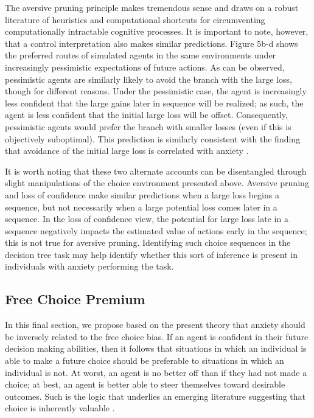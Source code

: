 \documentclass[11pt]{article} %
\begin{document}
The aversive pruning principle makes tremendous sense and draws on a robust literature of heuristics and computational shortcuts for circumventing computationally intractable cognitive processes. It is important to note, however, that a control interpretation also makes similar predictions. Figure 5b-d shows the preferred routes of simulated agents in the same environments under increasingly pessimistic expectations of future actions. As can be observed, pessimistic agents are similarly likely to avoid the branch with the large loss, though for different reasons. Under the pessimistic case, the agent is increasingly less confident that the large gains later in sequence will be realized; as such, the agent is less confident that the initial large loss will be offset. Consequently, pessimistic agents would prefer the branch with smaller losses (even if this is objectively suboptimal). This prediction is similarly consistent with the finding that avoidance of the initial large loss is correlated with anxiety \cite{Lally2017}.


It is worth noting that these two alternate accounts can be disentangled through slight manipulations of the choice environment presented above. Aversive pruning and loss of confidence make similar predictions when a large loss begins a sequence, but not necessarily when a large potential loss comes later in a sequence. In the loss of confidence view, the potential for large loss late in a sequence negatively impacts the estimated value of actions early in the sequence; this is not true for aversive pruning. Identifying such choice sequences in the decision tree task may help identify whether this sort of inference is present in individuals with anxiety performing the task.

\subsection{Free Choice Premium}

In this final section, we propose based on the present theory that anxiety should be inversely related to the free choice bias. If an agent is confident in their future decision making abilities, then it follows that situations in which an individual is able to make a future choice should be preferable to situations in which an individual is not. At worst, an agent is no better off than if they had not made a choice; at best, an agent is better able to steer themselves toward desirable outcomes. Such is the logic that underlies an emerging literature suggesting that choice is inherently valuable \citep{Leotti2010}.
\end{document}
